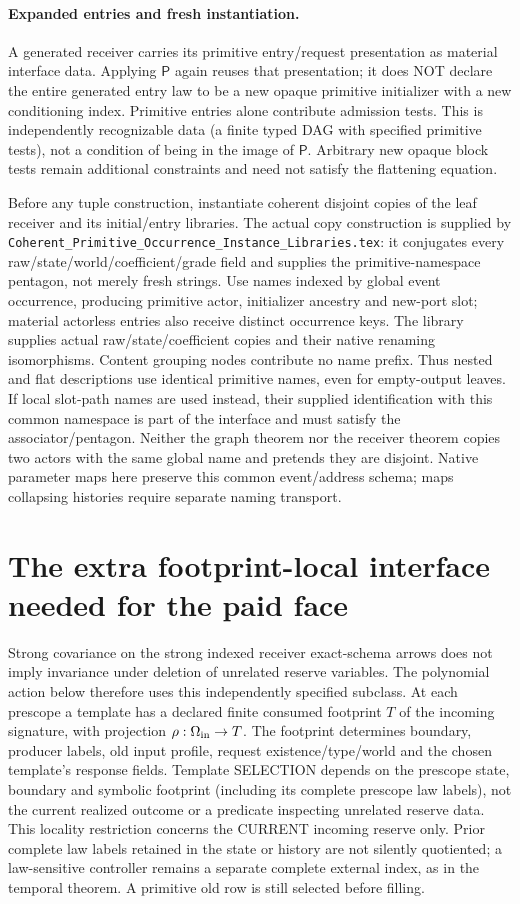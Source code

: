 \documentclass[11pt]{article}
\begin{document}
\paragraph{Expanded entries and fresh instantiation.}
A generated receiver carries its primitive entry/request presentation as material interface data. Applying $\mathsf P$ again reuses that presentation; it does NOT declare the entire generated entry law to be a new opaque primitive initializer with a new conditioning index. Primitive entries alone contribute admission tests. This is independently recognizable data (a finite typed DAG with specified primitive tests), not a condition of being in the image of $\mathsf P$. Arbitrary new opaque block tests remain additional constraints and need not satisfy the flattening equation.

Before any tuple construction, instantiate coherent disjoint copies of the leaf receiver and its initial/entry libraries. The actual copy construction is supplied by \texttt{Coherent\_Primitive\_Occurrence\_Instance\_Libraries.tex}: it conjugates every raw/state/world/coefficient/grade field and supplies the primitive-namespace pentagon, not merely fresh strings. Use names indexed by global event occurrence, producing primitive actor, initializer ancestry and new-port slot; material actorless entries also receive distinct occurrence keys. The library supplies actual raw/state/coefficient copies and their native renaming isomorphisms. Content grouping nodes contribute no name prefix. Thus nested and flat descriptions use identical primitive names, even for empty-output leaves. If local slot-path names are used instead, their supplied identification with this common namespace is part of the interface and must satisfy the associator/pentagon. Neither the graph theorem nor the receiver theorem copies two actors with the same global name and pretends they are disjoint. Native parameter maps here preserve this common event/address schema; maps collapsing histories require separate naming transport.

\section{The extra footprint-local interface needed for the paid face}
Strong covariance on the strong indexed receiver exact-schema arrows does not imply invariance under deletion of unrelated reserve variables. The polynomial action below therefore uses this independently specified subclass. At each prescope a template has a declared finite consumed footprint $T$ of the incoming signature, with projection $\rho:\Omega_{\rm in}\to T$. The footprint determines boundary, producer labels, old input profile, request existence/type/world and the chosen template's response fields. Template SELECTION depends on the prescope state, boundary and symbolic footprint (including its complete prescope law labels), not the current realized outcome or a predicate inspecting unrelated reserve data. This locality restriction concerns the CURRENT incoming reserve only. Prior complete law labels retained in the state or history are not silently quotiented; a law-sensitive controller remains a separate complete external index, as in the temporal theorem. A primitive old row is still selected before filling.
\end{document}

